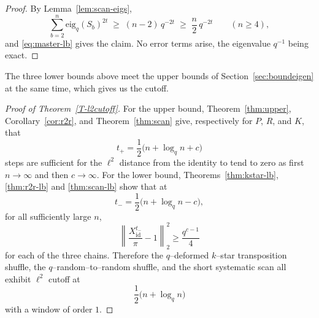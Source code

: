 \documentclass[11pt]{article}
\theoremstyle{plain}  %
\newtheorem{corollary}[theorem]{Corollary}
\newcommand{\eig}{\text{eig}} %
\begin{document}
\begin{proof}
By Lemma~\ref{lem:scan-eigs},
$$
  \sum_{b=2}^{n}\eig_q(S_b)^{2t}
  \;\ge\; (n-2)\,q^{-2t}
  \;\ge\; \frac n2\,q^{-2t}
  \qquad (n \ge 4),
$$
and \eqref{eq:master-lb} gives the claim. No error terms arise, the
eigenvalue $q^{-1}$ being exact.
\end{proof}




The three lower bounds above meet the upper bounds of
Section~\ref{sec:boundeigen} at the same time, which gives us the cutoff.



\begin{proof}[Proof of Theorem~\ref{T-l2cutoff}]
For the upper bound, Theorem~\ref{thm:upper}, Corollary~\ref{cor:r2r}, and Theorem~\ref{thm:scan} give, respectively for $P$, $R$, and $K$, that \[ t_+=\frac12\bigl(n+\log_q n+c\bigr) \] steps are sufficient for the $\ell^2$ distance from the identity to tend to zero as first $n\to\infty$ and then $c\to\infty$. For the lower bound, Theorems~\ref{thm:kstar-lb}, \ref{thm:r2r-lb} and \ref{thm:scan-lb} show that at \[ t_-=\frac12\bigl(n+\log_q n-c\bigr), \] for all sufficiently large $n$, \[ \left\| \frac{X_{\mathrm{id}}^{t_-}}{\pi}-1 \right\|_2^2 \ge \frac{q^{c-1}}{4} \] for each of the three chains. Therefore the $q$--deformed $k$--star transposition shuffle, the $q$--random--to--random shuffle, and the short systematic scan all exhibit $\ell^2$ cutoff at \[ \frac12\bigl(n+\log_q n\bigr) \] with a window of order $1$. \end{proof}






\end{document}
